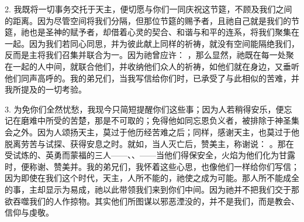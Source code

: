 2. 我既将一切事务交托于天主，便切愿与你们一同庆祝这节筵，不顾及我们之间的距离。因为尽管空间将我们分隔，但那位节筵的赐予者，且祂自己就是我们的节筵，祂也是圣神的赋予者，却借着心灵的契合、和谐与和平的连系，将我们聚集在一起。因为我们若同心同思，并为彼此献上同样的祈祷，就没有空间能隔绝我们，反而是主将我们召集并联合为一。因为祂曾应许： ，那么显然，祂既在每一处聚在一起的人中间，就联合他们，并收纳他们众人的祈祷，如他们就在身边，又垂听他们同声高呼的。我的弟兄们，当我写信给你们时，已承受了与此相似的苦难，并我所提及的一切考验。\par

3. 为免你们全然忧愁，我现今只简短提醒你们这些事；因为人若稍得安乐，便忘记在磨难中所受的苦楚，那是不可取的；免得他如同忘恩负义者，被排除于神圣集会之外。因为人颂扬天主，莫过于他历经苦难之后；同样，感谢天主，也莫过于他脱离劳苦与试探、获得安息之时。就如，当人灭亡后，赞美主，称谢说： 。那在受试炼的、英勇而蒙福的三人——、、——当他们得保安全，火焰为他们化为甘露时，便称谢、赞美并。我的弟兄们，我怀着这些心思，也像他们一样给你们写信；因为即使在我们这个时代，天主，人所不能的，祂使之成为可能。那人所不能成全的事，主却显示为易成，祂以此带领我们来到你们中间。因为祂并不把我们交于那欲吞噬我们的人作掠物。其实他们所图谋以邪恶湮没的，并不是我们，而是教会、信仰与虔敬。\par

